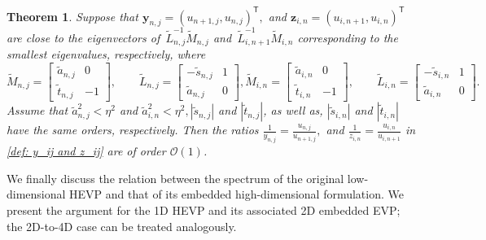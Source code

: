 \documentclass[11pt]{article}
\newcommand{\tr}{\textcolor{red}}
\newtheorem{thm}{Theorem}[section]
\numberwithin{equation}{section}
\begin{document}
\begin{thm} \label{thm: estimation of rho of 4D}
    Suppose that $ \boldsymbol{y}_{n,j} = (u_{n+1,j}, u_{n,j})^\mathsf{T}, $ and $
\boldsymbol{z}_{i,n} = (u_{i,n+1}, u_{i,n})^\mathsf{T} $
are close to the eigenvectors of $ \, \widetilde{L}_{n,j}^{-1}\widetilde{M}_{n,j}$
and $\, \widetilde{L}_{i,n+1}^{-1}\widetilde{M}_{i,n}$ corresponding to the
smallest eigenvalues, respectively, where
\begin{subequations} \label{total: symplectic matrices}
    \begin{equation} \label{def: symplectic 1}
\widetilde{M}_{n,j} =
\begin{bmatrix}
\widetilde{a}_{n,j} & 0 \\
\widetilde{t}_{n,j} & -1
\end{bmatrix},
\qquad
\widetilde{L}_{n,j} =
\begin{bmatrix}
-\widetilde{s}_{n,j} & 1 \\
\widetilde{a}_{n,j} & 0
\end{bmatrix},
\end{equation}

\begin{equation}\label{def: symplectic 2}
\widetilde{M}_{i,n} =
\begin{bmatrix}
\widetilde{a}_{i,n} & 0 \\
\widetilde{t}_{i,n} & -1
\end{bmatrix},
\qquad
\widetilde{L}_{i,n} =
\begin{bmatrix}
-\widetilde{s}_{i,n} & 1 \\
\widetilde{a}_{i,n} & 0
\end{bmatrix}.
\end{equation}
\end{subequations}
Assume that $ \widetilde{a}_{n,j}^2 < \eta^2 $ and $ \widetilde{a}_{i,n}^2 < \eta^2, |\widetilde{s}_{n,j}|$ and $|\widetilde{t}_{n,j}|$, as well as,  $|\widetilde{s}_{i,n}|$ and $|\widetilde{t}_{i,n}|$ have the same orders, respectively. Then the ratios $ \frac{1}{y_{n,j}} = \frac{u_{n,j}}{u_{n+1,j}}, $ and $ \frac{1}{z_{i,n}} = \frac{u_{i,n}}{u_{i,n+1}} $ in \eqref{def: y_ij and z_ij} are of order $\mathcal{O}(1)$.
\end{thm}

We finally discuss the relation between the spectrum of the original low-dimensional HEVP and that of its embedded high-dimensional formulation. We present the argument for the 1D HEVP and its associated 2D embedded EVP; the 2D-to-4D case can be treated analogously.
\end{document}
